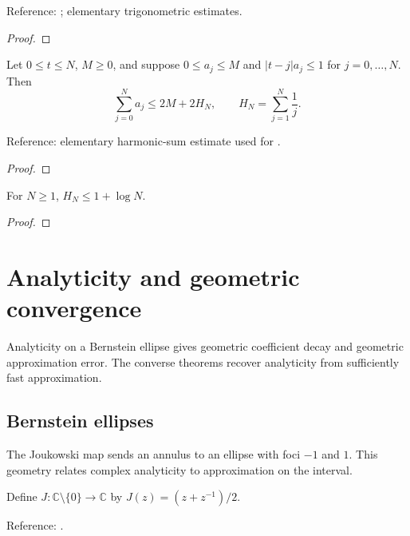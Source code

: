 \begin{supporting}
\begin{theorem}
Reference: \cite[Chapter 15]{atap}; elementary trigonometric estimates.
\end{theorem}
\begin{proof}
\leanok
\end{proof}

\begin{theorem}
\label{thm:harmonic-distance-sum}
\leanok
Let $0\le t\le N$, $M\ge0$, and suppose $0\le a_j\le M$ and
$|t-j|a_j\le1$ for $j=0,\ldots,N$. Then
\[
 \sum_{j=0}^N a_j\le2M+2H_N,\qquad H_N=\sum_{j=1}^N\frac1j.
\]

Reference: elementary harmonic-sum estimate used for \cite[Chapter 15]{atap}.
\end{theorem}
\begin{proof}
\leanok
\end{proof}

\begin{theorem}
\label{thm:harmonic-log}
\leanok
For $N\ge1$, $H_N\le1+\log N$.
\end{theorem}
\begin{proof}
\leanok
\end{proof}

\end{supporting}

\chapter{Analyticity and geometric convergence}\label{chap:analytic}


Analyticity on a Bernstein ellipse gives geometric coefficient decay and geometric approximation error. The converse theorems recover analyticity from sufficiently fast approximation.

\section{Bernstein ellipses}\label{sec:textbook-analytic-ellipse}

The Joukowski map sends an annulus to an ellipse with foci $-1$ and $1$. This geometry relates complex analyticity to approximation on the interval.

\begin{definition}
\label{def:joukowski}
\leanok
Define $J:\mathbb C\setminus\{0\}\to\mathbb C$ by
$J(z)=(z+z^{-1})/2$.

Reference: \cite[Chapter 8]{atap}.
\end{definition}

